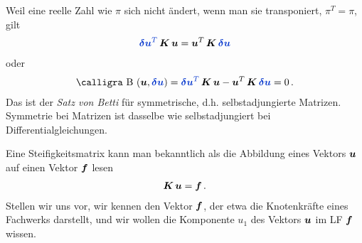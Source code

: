 Weil eine  reelle Zahl wie $\pi$ sich nicht \"{a}ndert, wenn man sie transponiert, $\pi^T = \pi$, gilt
\begin{align}
\textcolor{chapterTitleBlue}{\vek \delta \vek u^T}\,\vek K\,\vek u = \vek u^T\,\vek K\,\textcolor{chapterTitleBlue}{\vek \delta \vek u}
\end{align}
oder
\begin{align}\label{Eq39}
\text{\normalfont\calligra B\,\,}(\vek u,\textcolor{chapterTitleBlue}{\vek \delta \vek u})= \textcolor{chapterTitleBlue}{\vek \delta \vek u^T}\,\vek K\,\vek u - \vek u^T\,\vek K\,\textcolor{chapterTitleBlue}{\vek \delta \vek u} = 0\,.
\end{align}
Das ist der {\em Satz von Betti\/} f\"{u}r symmetrische, d.h. selbstadjungierte Matrizen.  Symmetrie bei Matrizen ist dasselbe wie selbstadjungiert bei Differentialgleichungen.

Eine Steifigkeitsmatrix kann man bekanntlich als die Abbildung eines Vektors $\mbox{\boldmath $u$}$ auf einen Vektor $\mbox{\boldmath $f$}$ lesen
\begin{align}
\mbox{\boldmath $K$}\,\mbox{\boldmath $u$} = \mbox{\boldmath $f$}\,.
\end{align}
Stellen wir uns vor, wir kennen den Vektor $\mbox{\boldmath $f$}$, der etwa die Knotenkr\"{a}fte eines Fachwerks darstellt, und wir wollen die Komponente $u_1$ des Vektors $\mbox{\boldmath $u$}$ im LF $\mbox{\boldmath $f$}$ wissen.

